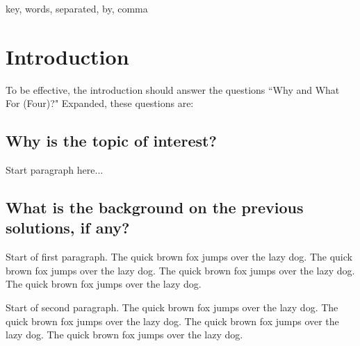\documentclass[journal]{./IEEE/IEEEtran}
\title{\SPTITLE}
\author{\ADVISEE~and~\ADVISER%
\REMARK
}
\begin{document}
\maketitle

\begin{abstract}
The abstract should be \textit{informational}. Typically a single paragraph
of about fifty to two hundred workds, the abstract allows your readers to judge
whether or not the article is of relevance to them. It should therefore be
a concise summary of the aims, scope, and conclusions of your work. There
is no space for unnecessary texts; an abstract should be kept to as few words
as possible while remaining reasonably informative. Irrelevancies, such as
minor details or a \textit{description} of the structure of the paper, are 
inappropriate, as are acronyms, abbreviations, and mathematics. Sentences such
as ``we review relevant literature" should be omitted.\cite{Zobel97}
\end{abstract}

\begin{keywords}
key, words, separated, by, comma
\end{keywords}

\section{Introduction}
To be effective, the introduction should answer the questions ``Why and What For (Four)?" Expanded, these questions are:\cite{Papadakis83}

\subsection{Why is the topic of interest?}
Start paragraph here...

\subsection{What is the background on the previous solutions, if any?}
Start of first paragraph. The quick brown fox jumps over the lazy dog. The quick
brown fox jumps over the lazy dog. The quick brown fox jumps over the lazy dog. The
quick brown fox jumps over the lazy dog.

Start of second paragraph. The quick brown fox jumps over the lazy dog. The quick
brown fox jumps over the lazy dog. The quick brown fox jumps over the lazy dog. The
quick brown fox jumps over the lazy dog.
\end{document}
